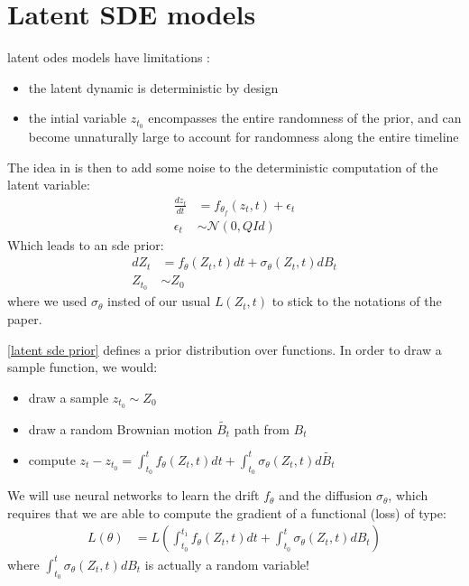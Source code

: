 \section{Latent SDE models}

\glspl{latent ode} models have limitations :
\begin{itemize}
    \item the latent dynamic is deterministic by design
    \item the intial variable $z_{t_0}$ encompasses the entire randomness of the prior, and can become
    unnaturally large to account for randomness along the entire timeline
\end{itemize}

The idea in \cite{li_scalable_2020} is then to add some noise to the deterministic computation of the latent variable:
\begin{align}
    \frac{dz_t}{dt} &= f_{\theta_f}(z_t,t) + \epsilon_t \\
    \epsilon_t &\sim \mathcal{N}(0,Q \textit{Id})
\end{align}
Which leads to an \gls{sde} prior:
\begin{align}
    \label{latent sde prior}
    dZ_t &= f_{\theta}(Z_t, t)dt + \sigma_{\theta}(Z_t,t)dB_t \\
    Z_{t_0} &\sim Z_0
\end{align}
where we used $\sigma_{\theta}$ insted of our usual $L(Z_t,t)$ to stick to the notations of the paper.

\ref{latent sde prior} defines a prior distribution over functions. In order to draw a sample function, we would:
\begin{itemize}
    \item draw a sample $z_{t_0} \sim Z_0$
    \item draw a random Brownian motion $\tilde{B_t}$ path from $B_t$
    \item compute $z_t - z_{t_0} = \int_{t_0}^{t} f_{\theta}(Z_t, t)dt + \int_{t_0}^{t} \sigma_{\theta}(Z_t,t)d\tilde{B_t}$
\end{itemize}

We will use neural networks to learn the drift $f_{\theta}$ and the diffusion $\sigma_{\theta}$, which requires that we are able to compute the gradient of 
a functional (loss) of type:
\begin{align}
    L(\theta) &= L \left( \int_{t_0}^{t_1} f_{\theta}(Z_t, t)dt + \int_{t_0}^{t} \sigma_{\theta}(Z_t,t)dB_t \right)
\end{align}
where $\int_{t_0}^{t} \sigma_{\theta}(Z_t,t)dB_t$ is actually a random variable!

